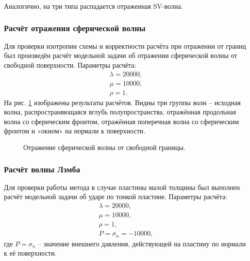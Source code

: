Аналогично, на три типа распадается отраженная SV-волна. 


\subsubsection{Расчёт отражения сферической волны}
Для проверки изотропии схемы и корректности расчёта при отражении от границ был произведён расчёт модельной задачи об отражении сферической волны от свободной поверхности. Параметры расчёта:
\begin{eqnarray}
\lambda=20000, \nonumber\\
\mu=10000, \nonumber\\
\rho=1.
\end{eqnarray}
На рис. \ref{pic:sphere_wave_reflection_2d} изображены результаты расчётов. Видны три группы волн -- исходная волна, распространяющаяся вглубь полупространства, отражённая продольная волна со сферическим фронтом, отражённая поперечная волна со сферическим фронтом и «окном» на нормали к поверхности.

\begin{figure}[h]
\caption{Отражение сферической волны от свободной границы.}
\label{pic:sphere_wave_reflection_2d}
\end{figure}

\clearpage
\newpage

\subsubsection{Расчёт волны Лэмба}

Для проверки работы метода в случае пластины малой толщины был выполнен расчёт модельной задачи об ударе по тонкой пластине. Параметры расчёта:
\begin{eqnarray}
\lambda=20000, \nonumber\\
\mu=10000, \nonumber\\
\rho=1, \nonumber\\
P = \sigma_n = -10000,
\end{eqnarray}
где $P = \sigma_n$ -- значение внешнего давления, действующей на пластину по нормали к её поверхности.

